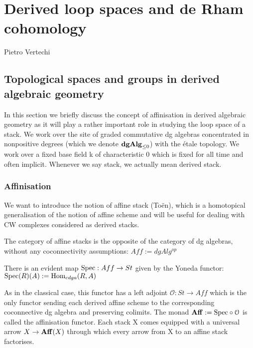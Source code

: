 \chapter{Derived loop spaces and de Rham cohomology}
\begin{flushright}
  Pietro Vertechi
\end{flushright}

\begin{refsection}

\section{Topological spaces and groups in derived algebraic geometry}
\label{topology}
In this section we briefly discuss the concept of affinisation in
derived algebraic geometry as it will play a rather important role in studying the loop space of a stack. We work over the site of graded commutative dg algebras
concentrated in nonpositive degrees (which we denote $\mathbf{dgAlg}_{\leq 0}$) with the \'etale topology. We work
over a fixed base field k of characteristic 0 which is fixed for all time and often implicit. Whenever we say stack, we actually mean derived stack.
\subsection{Affinisation}

We want to introduce the notion of affine stack (To\"en), which is a homotopical generalisation of the notion of affine scheme and will be useful for dealing
with CW complexes considered as derived stacks.
\begin{definition}
The category of affine stacks is the opposite of the category of dg algebras, without any coconnectivity assumptions: $Aff:=dgAlg^{op}$
\end{definition}

\begin{remark}
There is an evident map $\mathrm{Spec}: Aff \to St $ given by the Yoneda functor: $\mathrm{Spec}(R)(A):=\mathrm{Hom}_{cdga}(R,A)$
\end{remark}

As in the classical case, this functor has a left adjoint $\mathcal{O}: St \to Aff$ which is the only functor sending each derived affine scheme to the corresponding coconnective
dg algebra and preserving colimits.
The monad $\mathbf{Aff}:= \mathrm{Spec}\circ\mathcal{O}$ is called the affinisation functor. Each stack X comes equipped with a universal arrow $X\to\mathbf{Aff}(X)$ through which every arrow
from X to an affine stack factorises.\\


\end{refsection}

